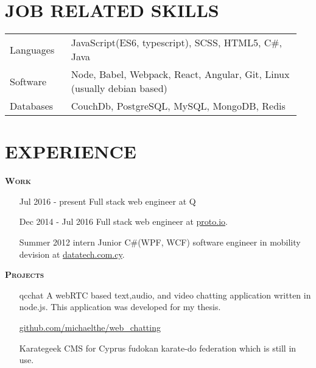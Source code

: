 \documentclass[margin, 10pt]{res} %
\begin{document}
\begin{resume}
\begin{tabular}{p{0.2\linewidth} p{0.75\linewidth}}
\end{tabular}

\section{JOB RELATED SKILLS}

\begin{tabular}{p{0.2\linewidth} p{0.75\linewidth}}

Languages & JavaScript(ES6, typescript), SCSS, HTML5, C\#, Java \\
Software & Node, Babel, Webpack, React, Angular, Git, Linux (usually debian based) \\
Databases & CouchDb, PostgreSQL, MySQL, MongoDB, Redis

\end{tabular}

\section{EXPERIENCE}

\textsc{ \textbf{Work}}

\begin{itemize}

\item[Jul 2016 - present] Full stack web engineer at Q \\

\item[Dec 2014 - Jul 2016] Full stack web engineer at
\href{https://proto.io/}{proto.io}. \\

\item[Summer 2012 intern] Junior C\#(WPF, WCF) software engineer in mobility devision at
\href{http://www.datatech.com.cy/}{datatech.com.cy}. \\

\end{itemize}

\textsc{ \textbf{Projects}}

\begin{itemize}

\item[qcchat] A webRTC based text,audio, and video chatting application written in node.js.
This application was developed for my thesis.

\href{https://github.com/michaelthe/web_chatting}{github.com/michaelthe/web\_chatting} \\

\item[Karategeek] CMS for Cyprus fudokan karate-do federation which is still in use.


\end{itemize}
\end{resume}
\end{document}

